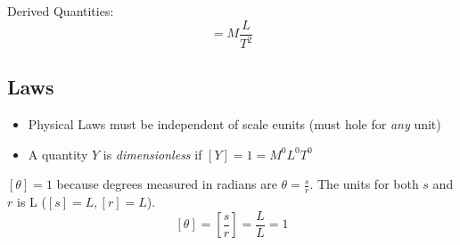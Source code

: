 \documentclass[
	date={August 21{,} 2024}
]{math486notes}
\begin{document}
Derived Quantities:
\begin{equation}
	[\mbox{force}] = M\frac{L}{T^{2}}\label{eq:force-quantity}
\end{equation}

\subsection{Laws}\label{subsec:laws}
\begin{itemize}
	\item Physical Laws must be independent of scale eunits (must hole for \emph{any} unit)
	\item A quantity $Y$ is \emph{dimensionless} if $[Y]=1=M^{0}L^{0}T^{0}$
\end{itemize}

\begin{example}
	$[\theta]=1$ because degrees measured in radians are $\theta=\frac{s}{r}$.
	The units for both $s$ and $r$ is L ($[s]=L, [r]=L$).
	\[ [\theta] = \left[ \frac{s}{r} \right] = \frac{L}{L} = 1 \]
\end{example}
\end{document}
